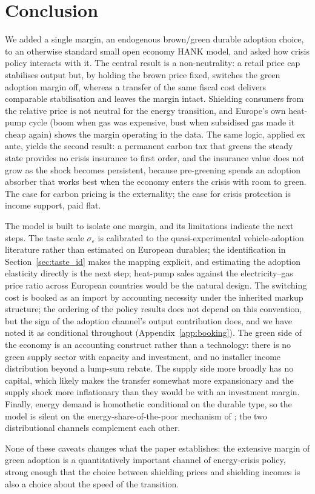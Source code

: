 \section{Conclusion}
\label{sec:conclusion}

We added a single margin, an endogenous brown/green durable adoption
choice, to an otherwise standard small open economy HANK model, and asked how
crisis policy interacts with it. The central result is a non-neutrality: a retail
price cap stabilises output but, by holding the brown price fixed, switches the
green adoption margin off, whereas a transfer of the same fiscal cost delivers
comparable stabilisation and leaves the margin intact. Shielding consumers from
the relative price is not neutral for the energy transition, and Europe's own
heat-pump cycle (boom when gas was expensive, bust when subsidised gas made it
cheap again) shows the margin operating in the data. The same logic, applied
ex ante, yields the second result: a permanent carbon tax that greens the steady
state provides no crisis insurance to first order, and the insurance value does
not grow as the shock becomes persistent, because pre-greening spends an adoption
absorber that works best when the economy enters the crisis with room to green.
The case for carbon pricing is the externality; the case for crisis protection is
income support, paid flat.

\label{sec:limits}%
The model is built to isolate one margin, and its limitations indicate the next
steps. The taste scale $\sigma_\varepsilon$ is calibrated to the
quasi-experimental vehicle-adoption literature rather than estimated on
European durables; the identification in
Section~\ref{sec:taste_id} makes the mapping explicit, and estimating the
adoption elasticity directly is the next step; heat-pump sales against
the electricity--gas price ratio across European countries would be the natural
design. The switching cost is booked as an import by accounting
necessity under the inherited markup structure; the ordering of the policy
results does not depend on this convention, but the sign of the adoption
channel's output contribution does, and we have noted it as conditional
throughout (Appendix~\ref{app:booking}). The green side of the economy is an accounting construct
rather than a technology: there is no green supply sector with capacity and
investment, and no installer income distribution beyond a lump-sum rebate. The
supply side more broadly has no capital, which likely makes the transfer
somewhat more expansionary and the supply shock more inflationary than
they would be with an investment margin. Finally, energy demand is homothetic
conditional on the durable type, so the model is silent on the
energy-share-of-the-poor mechanism of \citet{bayer2026hank}; the two
distributional channels complement each other.

None of these caveats changes what the paper establishes: the extensive margin
of green adoption is a quantitatively important channel of energy-crisis policy,
strong enough that the choice between shielding prices and shielding incomes
is also a choice about the speed of the transition.
